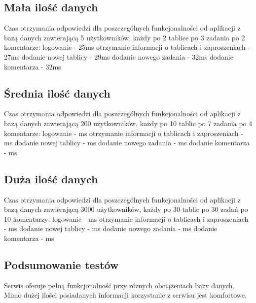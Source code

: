 \documentclass[12pt]{report}
\begin{document}
\subsection{Mała ilość danych}
Czas otrzymania odpowiedzi dla poszczególnych funkcjonalności od aplikacji z bazą danych zawierającą 5 użytkowników, każdy po 2 tablice po 3 zadania po 2 komentarze:\newline
logowanie - 25ms \newline
otrzymanie informacji o tablicach i zaproszeniach - 27ms \newline
dodanie nowej tablicy - 29ms \newline
dodanie nowego zadania - 32ms \newline
dodanie komentarza - 32ms

\subsection{Średnia ilość danych}
Czas otrzymania odpowiedzi dla poszczególnych funkcjonalności od aplikacji z bazą danych zawierającą 200 użytkowników, każdy po 10 tablic po 7 zadania po 4 komentarze:\newline
logowanie - ms \newline
otrzymanie informacji o tablicach i zaproszeniach - ms \newline
dodanie nowej tablicy - ms \newline
dodanie nowego zadania - ms \newline
dodanie komentarza - ms

\subsection{Duża ilość danych}
Czas otrzymania odpowiedzi dla poszczególnych funkcjonalności od aplikacji z bazą danych zawierającą 3000 użytkowników, każdy po 30 tablic po 30 zadań po 10 komentarzy: \newline
logowanie - ms\newline
otrzymanie informacji o tablicach i zaproszeniach - ms\newline
dodanie nowej tablicy - ms\newline
dodanie nowego zadania - ms\newline
dodanie komentarza - ms

\subsection{Podsumowanie testów}
Serwis oferuje pełną funkcjonalność przy różnych obciążeniach bazy danych. Mimo dużej ilości posiadanych informacji korzystanie z serwisu jest komfortowe.
\end{document}

